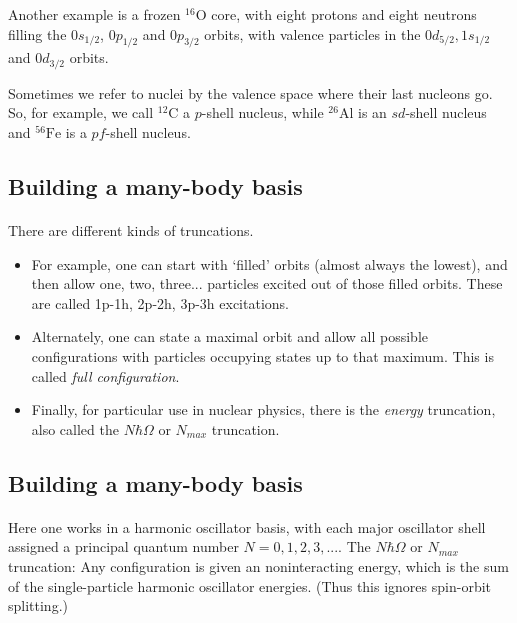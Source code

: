 \documentclass[%
oneside,                 %
final,                   %
10pt]{article}
\begin{document}
Another example is a frozen $^{16}\mbox{O}$ core, with eight protons and eight neutrons filling the 
$0s_{1/2}$,  $0p_{1/2}$ and $0p_{3/2}$ orbits, with valence particles in the 
$0d_{5/2}, 1s_{1/2}$ and $0d_{3/2}$ orbits.

Sometimes we refer to nuclei by the valence space where their last nucleons go.  
So, for example, we call $^{12}\mbox{C}$ a $p$-shell nucleus, while $^{26}\mbox{Al}$ is an 
$sd$-shell nucleus and $^{56}\mbox{Fe}$ is a $pf$-shell nucleus.



\subsection*{Building a many-body basis}

\paragraph{}
There are different kinds of truncations.

\begin{itemize}
\item For example, one can start with `filled' orbits (almost always the lowest), and then  allow one, two, three... particles excited out of those filled orbits. These are called  1p-1h, 2p-2h, 3p-3h excitations. 

\item Alternately, one can state a maximal orbit and allow all possible configurations with  particles occupying states up to that maximum. This is called \emph{full configuration}.

\item Finally, for particular use in nuclear physics, there is the \emph{energy} truncation, also  called the $N\hbar\Omega$ or $N_{max}$ truncation. 
\end{itemize}

\noindent



\subsection*{Building a many-body basis}

\paragraph{}
Here one works in a harmonic oscillator basis, with each major oscillator shell assigned  a principal quantum number $N=0,1,2,3,...$. 
The $N\hbar\Omega$ or $N_{max}$ truncation: Any configuration is given an noninteracting energy, which is the sum 
of the single-particle harmonic oscillator energies. (Thus this ignores 
spin-orbit splitting.)
\end{document}
